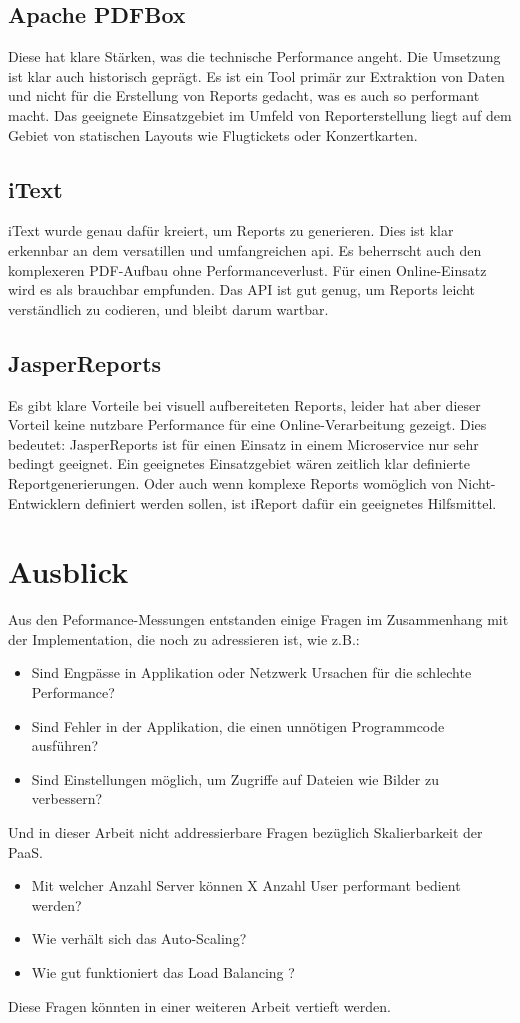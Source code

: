 \documentclass[main.tex]{subfiles}
\begin{document}
\subsection{Apache PDFBox}

Diese hat klare Stärken, was die technische Performance angeht. 
Die Umsetzung ist klar auch historisch geprägt. Es ist ein Tool primär zur Extraktion von Daten und nicht für die Erstellung von Reports gedacht, was es auch so performant macht. Das geeignete Einsatzgebiet im Umfeld von Reporterstellung liegt auf dem Gebiet von statischen Layouts wie Flugtickets oder Konzertkarten.


\subsection{iText}

iText wurde genau dafür kreiert, um Reports zu generieren. Dies ist klar erkennbar an dem versatillen und umfangreichen \acrshort{api}. Es beherrscht auch den komplexeren PDF-Aufbau ohne Performanceverlust. Für einen Online-Einsatz wird es als brauchbar empfunden. Das API ist gut genug, um Reports leicht verständlich zu codieren, und bleibt darum wartbar.

\subsection{JasperReports}
Es gibt klare Vorteile bei visuell aufbereiteten Reports, leider hat aber dieser Vorteil keine nutzbare Performance für eine Online-Verarbeitung gezeigt. Dies bedeutet: JasperReports ist für einen Einsatz in einem Microservice nur sehr bedingt geeignet. Ein geeignetes Einsatzgebiet wären zeitlich klar definierte Reportgenerierungen. Oder auch wenn komplexe Reports womöglich von Nicht-Entwicklern definiert werden sollen, ist iReport dafür ein geeignetes Hilfsmittel.

\section{Ausblick}

Aus den Peformance-Messungen entstanden einige Fragen im Zusammenhang mit der Implementation, die noch zu adressieren ist, wie z.B.: 
\begin{itemize}  
    \item Sind Engpässe in Applikation oder Netzwerk Ursachen für die schlechte Performance? 
    \item Sind Fehler in der Applikation, die einen unnötigen Programmcode ausführen?
    \item Sind Einstellungen möglich, um Zugriffe auf Dateien wie Bilder zu verbessern?
\end{itemize}
Und in dieser Arbeit nicht addressierbare Fragen bezüglich Skalierbarkeit der PaaS.
\begin{itemize}  
    \item Mit welcher Anzahl Server können X Anzahl User performant bedient werden?
    \item Wie verhält sich das Auto-Scaling?
    \item Wie gut funktioniert das Load Balancing ? 
\end{itemize}
Diese Fragen könnten in einer weiteren Arbeit vertieft werden. 
\end{document}
